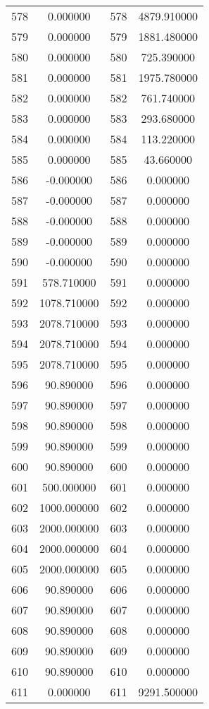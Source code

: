 \documentclass[12pt]{article}
\begin{document}
\begin{longtable}{@{}cccc@{}}
578 & 0.000000 & 578 & 4879.910000 \\
579 & 0.000000 & 579 & 1881.480000 \\
580 & 0.000000 & 580 & 725.390000 \\
581 & 0.000000 & 581 & 1975.780000 \\
582 & 0.000000 & 582 & 761.740000 \\
583 & 0.000000 & 583 & 293.680000 \\
584 & 0.000000 & 584 & 113.220000 \\
585 & 0.000000 & 585 & 43.660000 \\
586 & -0.000000 & 586 & 0.000000 \\
587 & -0.000000 & 587 & 0.000000 \\
588 & -0.000000 & 588 & 0.000000 \\
589 & -0.000000 & 589 & 0.000000 \\
590 & -0.000000 & 590 & 0.000000 \\
591 & 578.710000 & 591 & 0.000000 \\
592 & 1078.710000 & 592 & 0.000000 \\
593 & 2078.710000 & 593 & 0.000000 \\
594 & 2078.710000 & 594 & 0.000000 \\
595 & 2078.710000 & 595 & 0.000000 \\
596 & 90.890000 & 596 & 0.000000 \\
597 & 90.890000 & 597 & 0.000000 \\
598 & 90.890000 & 598 & 0.000000 \\
599 & 90.890000 & 599 & 0.000000 \\
600 & 90.890000 & 600 & 0.000000 \\
601 & 500.000000 & 601 & 0.000000 \\
602 & 1000.000000 & 602 & 0.000000 \\
603 & 2000.000000 & 603 & 0.000000 \\
604 & 2000.000000 & 604 & 0.000000 \\
605 & 2000.000000 & 605 & 0.000000 \\
606 & 90.890000 & 606 & 0.000000 \\
607 & 90.890000 & 607 & 0.000000 \\
608 & 90.890000 & 608 & 0.000000 \\
609 & 90.890000 & 609 & 0.000000 \\
610 & 90.890000 & 610 & 0.000000 \\
611 & 0.000000 & 611 & 9291.500000 \\

\end{longtable}
\end{document}
